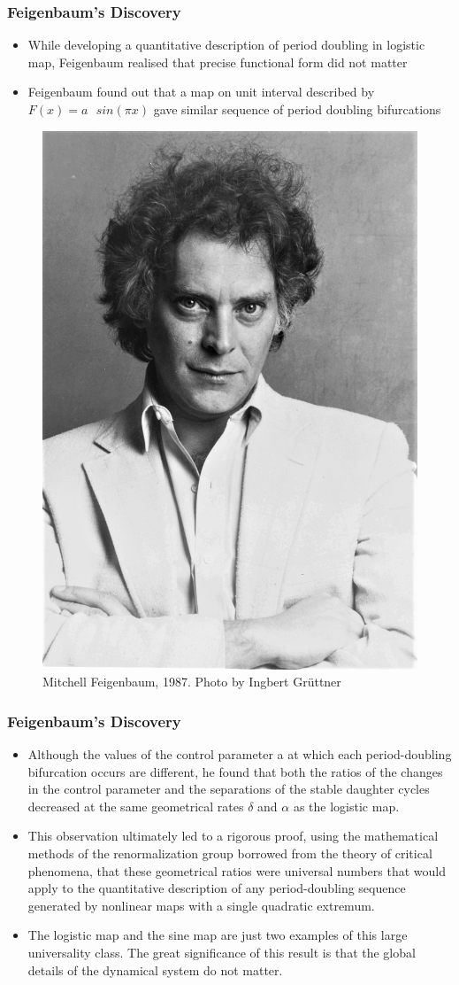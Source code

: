 \documentclass[
	11pt, %
	aspectratio=169, %
]{beamer}
\begin{document}
\begin{frame}
	\frametitle{Feigenbaum's Discovery}
	
	\begin{itemize}
        \item While developing a quantitative description of period doubling in logistic map, Feigenbaum realised that precise functional form did not matter \pause
        \item Feigenbaum found out that a map on unit interval described by {\color{red}$F(x) = a\text{ }sin(\pi x)$} gave similar sequence of period doubling bifurcations \pause
    \end{itemize}

    \begin{figure}
		\includegraphics[width=0.15\linewidth]{feigenbaum.jpg}
		\caption{Mitchell Feigenbaum, 1987. Photo by Ingbert Grüttner}
	\end{figure}

\end{frame}


\begin{frame}
	\frametitle{Feigenbaum's Discovery}
	
	\begin{itemize}
        \item  Although the values of the control parameter a at which each period-doubling bifurcation occurs are different, he found that both the ratios of the changes in the control parameter and the separations of the stable daughter cycles decreased at the same geometrical rates $\delta$ and $\alpha$ as the logistic map. \pause
        \item This observation ultimately led to a rigorous proof, using the mathematical methods of the renormalization group borrowed from the theory of critical phenomena, that these geometrical ratios were universal numbers that would apply to the quantitative description of any period-doubling sequence generated by nonlinear maps with a single quadratic extremum. \pause
        \item The logistic map and the sine map are just two examples of this large universality class. The great significance of this result is that the global details of the dynamical system do not matter.
    \end{itemize}

\end{frame}
\end{document}
